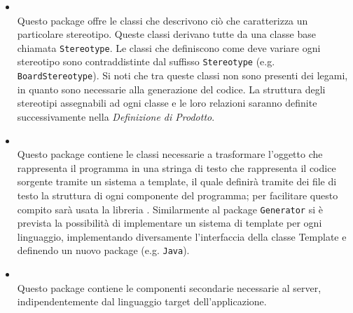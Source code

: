 \begin{itemize}
\begin{itemize}
\item \hyperref[\nogloxy{swedesigner::server::stereotype}]{}\\
Questo package offre le classi che descrivono ciò che caratterizza un particolare stereotipo. Queste classi derivano tutte da una classe base chiamata \texttt{Stereotype}. Le classi che definiscono come deve variare ogni stereotipo sono contraddistinte dal suffisso \texttt{Stereotype} (e.g. \texttt{BoardStereotype}). Si noti che tra queste classi non sono presenti dei legami, in quanto sono necessarie alla generazione del codice. La struttura degli stereotipi assegnabili ad ogni classe e le loro relazioni saranno definite successivamente nella \emph{Definizione di Prodotto}.
\item \hyperref[\nogloxy{swedesigner::server::template}]{}\\
Questo package contiene le classi necessarie a trasformare l'oggetto che rappresenta il programma in una stringa di testo che rappresenta il codice sorgente tramite un sistema a template, il quale definirà tramite dei file di testo la struttura di ogni componente del programma; per facilitare questo compito sarà usata la libreria \stringtemplate{}. Similarmente al package \texttt{Generator} si è prevista la possibilità di implementare un sistema di template per ogni linguaggio, implementando diversamente l'interfaccia della classe Template e definendo un nuovo package (e.g. \texttt{Java}).
\item \hyperref[\nogloxy{swedesigner::server::utility}]{}\\
Questo package contiene le componenti secondarie necessarie al server, indipendentemente dal linguaggio target dell'applicazione.
\end{itemize}
\end{itemize}

\subsection{}
\label{\nogloxy{swedesigner::server::compiler}}
